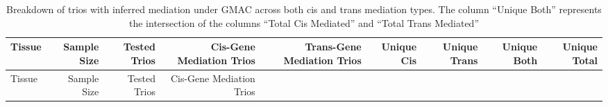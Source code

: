 \documentclass[
]{article}
\begin{document}
\begin{longtable}[]{@{}lrrrrrrrr@{}}
\caption{Breakdown of trios with inferred mediation under GMAC across
both cis and trans mediation types. The column ``Unique Both''
represents the intersection of the columns ``Total Cis Mediated'' and
``Total Trans Mediated''}\tabularnewline
\toprule
\begin{minipage}[b]{0.10\columnwidth}\raggedright
Tissue\strut
\end{minipage} & \begin{minipage}[b]{0.06\columnwidth}\raggedleft
Sample Size\strut
\end{minipage} & \begin{minipage}[b]{0.07\columnwidth}\raggedleft
Tested Trios\strut
\end{minipage} & \begin{minipage}[b]{0.13\columnwidth}\raggedleft
Cis-Gene Mediation Trios\strut
\end{minipage} & \begin{minipage}[b]{0.14\columnwidth}\raggedleft
Trans-Gene Mediation Trios\strut
\end{minipage} & \begin{minipage}[b]{0.06\columnwidth}\raggedleft
Unique Cis\strut
\end{minipage} & \begin{minipage}[b]{0.07\columnwidth}\raggedleft
Unique Trans\strut
\end{minipage} & \begin{minipage}[b]{0.06\columnwidth}\raggedleft
Unique Both\strut
\end{minipage} & \begin{minipage}[b]{0.07\columnwidth}\raggedleft
Unique Total\strut
\end{minipage}\tabularnewline
\midrule
\endfirsthead
\toprule
\begin{minipage}[b]{0.10\columnwidth}\raggedright
Tissue\strut
\end{minipage} & \begin{minipage}[b]{0.06\columnwidth}\raggedleft
Sample Size\strut
\end{minipage} & \begin{minipage}[b]{0.07\columnwidth}\raggedleft
Tested Trios\strut
\end{minipage} & \begin{minipage}[b]{0.13\columnwidth}\raggedleft
Cis-Gene Mediation Trios\strut
\end{minipage} & \begin{minipage}[b]{0.14\columnwidth}\raggedleft

\end{minipage}
\end{longtable}
\end{document}
